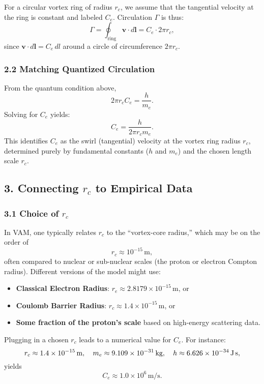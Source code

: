For a circular vortex ring of radius \(r_c\), we assume that the tangential velocity at the ring is constant and labeled \(C_e\). Circulation \(\Gamma\) is thus:
\[
    \Gamma = \oint_{\text{ring}} \mathbf{v} \cdot d\mathbf{l} = C_e \cdot 2 \pi r_c,
\]
since \(\mathbf{v} \cdot d\mathbf{l} = C_e \,dl\) around a circle of circumference \(2\pi r_c\).

\subsubsection*{2.2 Matching Quantized Circulation}

From the quantum condition above,
\[
    2 \pi r_c C_e = \frac{h}{m_e}.
\]
Solving for \(C_e\) yields:
\[
    C_e = \frac{h}{2 \pi r_c m_e}.
\]
This identifies \(C_e\) as the swirl (tangential) velocity at the vortex ring radius \(r_c\), determined purely by fundamental constants (\(h\) and \(m_e\)) and the chosen length scale \(r_c\).

\subsection*{3. Connecting \(r_c\) to Empirical Data}

\subsubsection*{3.1 Choice of \(r_c\)}

In VAM, one typically relates \(r_c\) to the “vortex-core radius,” which may be on the order of
\[
    r_c \approx 10^{-15}\,\text{m},
\]
often compared to nuclear or sub-nuclear scales (the proton or electron Compton radius). Different versions of the model might use:
\begin{itemize}
    \item \textbf{Classical Electron Radius}: \(r_e \approx 2.8179 \times 10^{-15}\,\mathrm{m}\), or
    \item \textbf{Coulomb Barrier Radius}: \(r_c \approx 1.4 \times 10^{-15}\,\mathrm{m}\), or
    \item \textbf{Some fraction of the proton’s scale} based on high-energy scattering data.
\end{itemize}

Plugging in a chosen \(r_c\) leads to a numerical value for \(C_e\). For instance:
\[
    r_c \approx 1.4 \times 10^{-15}\,\text{m}, \quad m_e \approx 9.109 \times 10^{-31}\,\text{kg}, \quad h \approx 6.626 \times 10^{-34}\,\text{J\,s},
\]
yields
\[
    C_e \approx 1.0 \times 10^6 \,\text{m/s}.
\]

